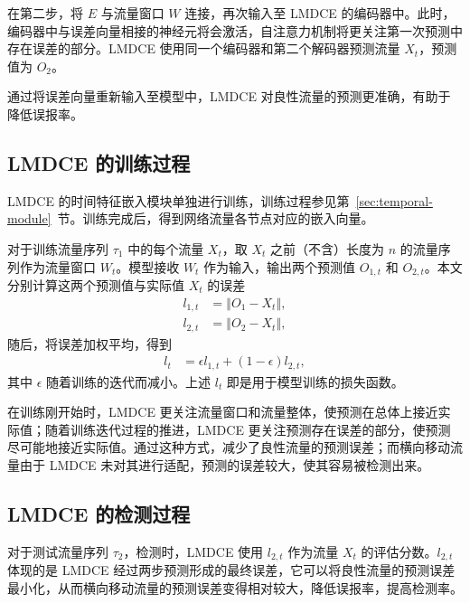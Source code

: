 {在第二步，将 $E$ 与流量窗口 $W$ 连接，再次输入至 LMDCE 的编码器中。此时，编码器中与误差向量相接的神经元将会激活，自注意力机制将更关注第一次预测中存在误差的部分。LMDCE 使用同一个编码器和第二个解码器预测流量 $X_t$，预测值为 $O_2$。

通过将误差向量重新输入至模型中，LMDCE 对良性流量的预测更准确，有助于降低误报率。

\subsection{LMDCE 的训练过程}

LMDCE 的时间特征嵌入模块单独进行训练，训练过程参见第~\ref{sec:temporal-module}~节。训练完成后，得到网络流量各节点对应的嵌入向量。

对于训练流量序列 $\tau_1$ 中的每个流量 $X_t$，取 $X_t$ 之前（不含）长度为 $n$ 的流量序列作为流量窗口 $W_t$。模型接收 $W_t$ 作为输入，输出两个预测值 $O_{1,t}$ 和 $O_{2,t}$。本文分别计算这两个预测值与实际值 $X_t$ 的误差
\begin{equation}
    \label{eq:loss}
    \begin{split}
        l_{1,t} &= \left\Vert O_1 - X_t \right\Vert,\\
        l_{2,t} &= \left\Vert O_2 - X_t \right\Vert,
    \end{split}
\end{equation}
随后，将误差加权平均，得到
\begin{equation}
    \label{eq:total-loss}
    \begin{split}
        l_t &= \epsilon l_{1,t} + (1-\epsilon)l_{2,t} ,
    \end{split}
\end{equation}
其中 $\epsilon$ 随着训练的迭代而减小。上述 $l_t$ 即是用于模型训练的损失函数。

在训练刚开始时，LMDCE 更关注流量窗口和流量整体，使预测在总体上接近实际值；随着训练迭代过程的推进，LMDCE 更关注预测存在误差的部分，使预测尽可能地接近实际值。通过这种方式，减少了良性流量的预测误差；而横向移动流量由于 LMDCE 未对其进行适配，预测的误差较大，使其容易被检测出来。

\subsection{LMDCE 的检测过程}

对于测试流量序列 $\tau_2$，检测时，LMDCE 使用 $l_{2,t}$ 作为流量 $X_t$ 的评估分数。$l_{2,t}$ 体现的是 LMDCE 经过两步预测形成的最终误差，它可以将良性流量的预测误差最小化，从而横向移动流量的预测误差变得相对较大，降低误报率，提高检测率。

}
